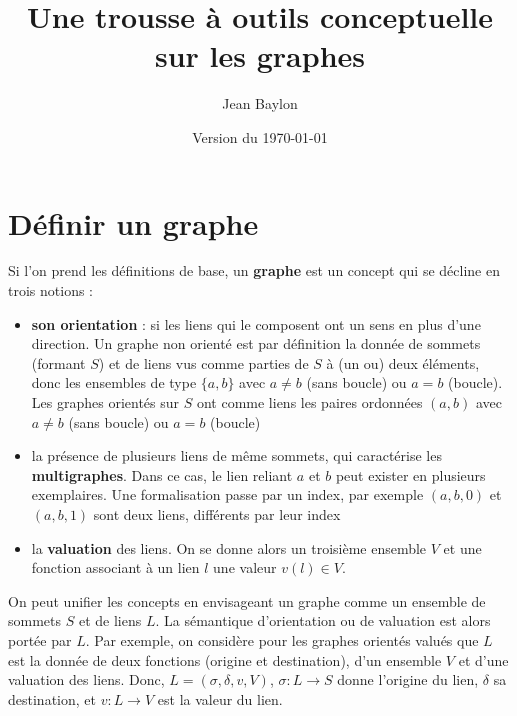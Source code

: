 \documentclass[11pt,a4paper]{report}
\title{Une trousse à outils conceptuelle sur les graphes}
\author{Jean Baylon}
\date{Version du \today{}}
\begin{document}
	
	\maketitle
	\tableofcontents
	
	\chapter{Définir un graphe}
	
	Si l'on prend les définitions de base, un \textbf{graphe} est un concept qui se décline en trois notions : 
	\begin{itemize}
		\item \textbf{son orientation} : si les liens qui le composent ont un sens en plus d'une direction. Un graphe non orienté est par définition la donnée de sommets (formant $S$) et de liens vus comme parties de $S$ à (un ou) deux éléments, donc les ensembles de type $\{a,b\}$ avec $a \neq b$ (sans boucle) ou $a=b$ (boucle). Les graphes orientés sur $S$ ont comme liens les paires ordonnées $(a,b)$ avec $a \neq b$ (sans boucle) ou $a=b$ (boucle)
		\item la présence de plusieurs liens de même sommets, qui caractérise les \textbf{multigraphes}. Dans ce cas, le lien reliant $a$ et $b$ peut exister en plusieurs exemplaires. Une formalisation passe par un index, par exemple $(a,b,0)$ et $(a,b,1)$ sont deux liens, différents par leur index
		\item la \textbf{valuation} des liens. On se donne alors un troisième ensemble $V$ et une fonction associant à un lien $l$ une valeur $v(l) \in V$. 
	\end{itemize}
	
	\vspace{0.5cm}
	On peut unifier les concepts en envisageant un graphe comme un ensemble de sommets $S$ et de liens $L$. La sémantique d'orientation ou de valuation est alors portée par $L$. Par exemple, on considère pour les graphes orientés valués que $L$ est la donnée de deux fonctions (origine et destination), d'un ensemble $V$ et d'une valuation des liens. Donc, $L = (\sigma,\delta,v,V)$, $\sigma : L \rightarrow S$ donne l'origine du lien, $\delta$ sa destination, et $v : L \rightarrow V$ est la valeur du lien. 
	
\end{document}
